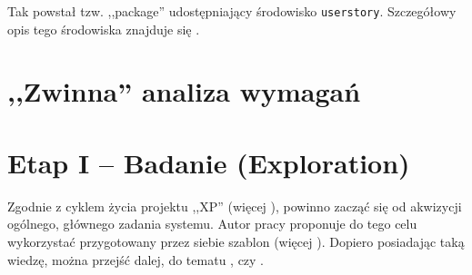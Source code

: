 Tak powstał tzw. ,,package'' udostępniający środowisko \texttt{userstory}. Szczegółowy opis tego środowiska znajduje się .

\section{,,Zwinna'' analiza wymagań}
\label{sec:zwinnaSpecyfikacjaWymagan}


\section{Etap I -- Badanie (Exploration)}
\label{sec:SWbadanie}

Zgodnie z cyklem życia projektu ,,XP'' (więcej ), powinno zacząć się od akwizycji ogólnego, głównego zadania systemu. Autor pracy proponuje do tego celu wykorzystać przygotowany przez siebie szablon (więcej ). Dopiero posiadając taką wiedzę, można przejść dalej, do tematu , czy .

